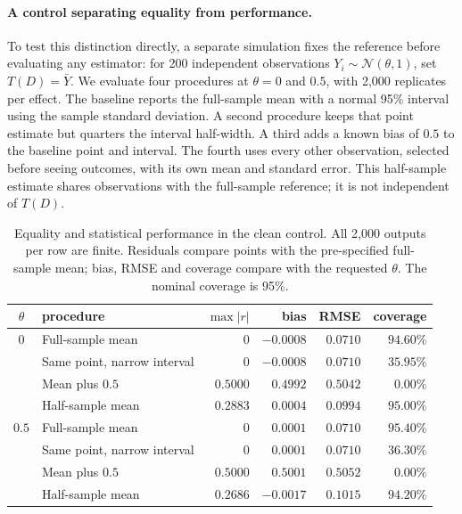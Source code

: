 \paragraph{A control separating equality from performance.}
To test this distinction directly, a separate simulation fixes the reference
before evaluating any estimator: for 200 independent observations
$Y_i\sim\mathcal N(\theta,1)$, set $T(D)=\bar Y$. We evaluate four procedures
at $\theta=0$ and $0.5$, with 2{,}000 replicates per effect. The baseline
reports the full-sample mean with a normal 95\% interval using the sample
standard deviation. A second procedure keeps that point estimate but quarters
the interval half-width. A third adds a known bias of $0.5$ to the baseline
point and interval. The fourth uses every other observation, selected before
seeing outcomes, with its own mean and standard error. This half-sample
estimate shares observations with the full-sample reference; it is not
independent of $T(D)$.

\begin{table}[htbp]
\centering\small
\caption{Equality and statistical performance in the clean control. All
2{,}000 outputs per row are finite. Residuals compare points with the
pre-specified full-sample mean; bias, RMSE and coverage compare with the
requested $\theta$. The nominal coverage is 95\%.}
\label{tab:cleancontrol}
\begin{tabular}{@{}clrrrr@{}}
\toprule
$\theta$ & procedure & $\max|r|$ & bias & RMSE & coverage \\
\midrule
$0$ & Full-sample mean & $0$ & $-0.0008$ & $0.0710$ & $94.60\%$ \\
 & Same point, narrow interval & $0$ & $-0.0008$ & $0.0710$ & $35.95\%$ \\
 & Mean plus $0.5$ & $0.5000$ & $0.4992$ & $0.5042$ & $0.00\%$ \\
 & Half-sample mean & $0.2883$ & $0.0004$ & $0.0994$ & $95.00\%$ \\
\midrule
$0.5$ & Full-sample mean & $0$ & $0.0001$ & $0.0710$ & $95.40\%$ \\
 & Same point, narrow interval & $0$ & $0.0001$ & $0.0710$ & $36.30\%$ \\
 & Mean plus $0.5$ & $0.5000$ & $0.5001$ & $0.5052$ & $0.00\%$ \\
 & Half-sample mean & $0.2686$ & $-0.0017$ & $0.1015$ & $94.20\%$ \\
\bottomrule
\end{tabular}
\end{table}

